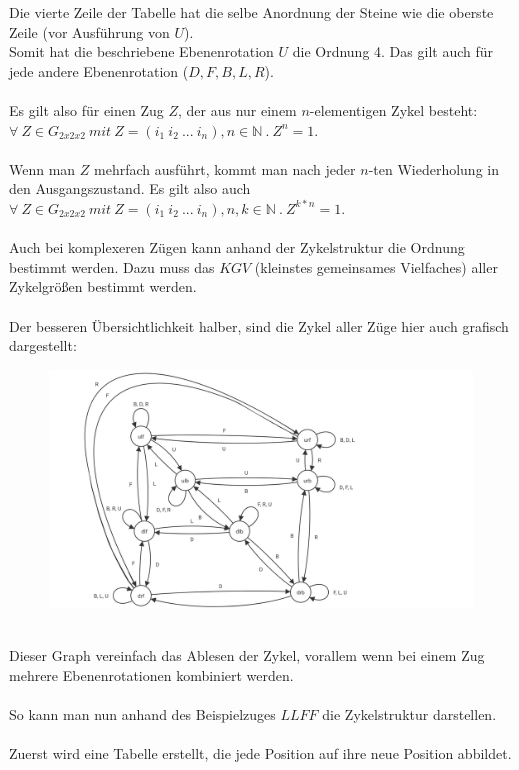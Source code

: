 \documentclass[12pt,a4paper, usenames, dvipsnames]{article}
\begin{document}
Die vierte Zeile der Tabelle hat die selbe Anordnung der Steine wie die oberste Zeile (vor Ausführung von $U$). \\
Somit hat die beschriebene Ebenenrotation $U$ die Ordnung 4. Das gilt auch für jede andere Ebenenrotation ($D, F, B, L, R$).\\
\\
Es gilt also für einen Zug $Z$, der aus nur einem $n$-elementigen Zykel besteht: \\ 
${\forall \ Z \in G_{2x2x2}\ mit \ Z=(i_1 \ i_2 \ ... \ i_n), n \in \mathbb{N} \ . \  Z^n=1 }$. \\
\\
Wenn man $Z$ mehrfach ausführt, kommt man nach jeder $n$-ten Wiederholung in den Ausgangszustand. \cite{TD} Es gilt also auch 
${\forall \ Z \in G_{2x2x2}\ mit \ Z=(i_1 \ i_2 \ ... \ i_n), n,k \in \mathbb{N} \ . \  Z^{k*n}=1 }$.
\\
\\
Auch bei komplexeren Zügen kann anhand der Zykelstruktur die Ordnung bestimmt werden. Dazu muss das $KGV$ (kleinstes gemeinsames Vielfaches) aller Zykelgrößen bestimmt werden. \cite{TD}
\\
\\
\newpage 
Der besseren Übersichtlichkeit halber, sind die Zykel aller Züge hier auch grafisch dargestellt:

\begin{figure}[H]
\includegraphics[scale=0.3]{graph_zug.png}
\caption[Graph aller Zugpermutationen]{}
\end{figure}
\ \\
Dieser Graph vereinfach das Ablesen der Zykel, vorallem wenn bei einem Zug mehrere Ebenenrotationen kombiniert werden. \\
\\
So kann man nun anhand des Beispielzuges $LLFF$ die Zykelstruktur darstellen. \\
\\
Zuerst wird eine Tabelle erstellt, die jede Position auf ihre neue Position abbildet. 
\end{document}
